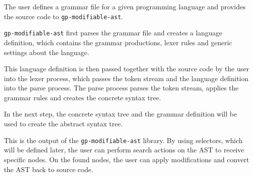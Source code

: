 The user defines a grammar file for a given programming language and provides the source code to \verb|gp-modifiable-ast|.

\verb|gp-modifiable-ast| first parses the grammar file and creates a language definition, which contains the grammar productions, lexer rules and generic settings
about the language.

This language definition is then passed together with the source code by the user into the lexer process, which passes the token stream and the language definition into
the parse process. The parse process parses the token stream, applies the grammar rules and creates the concrete syntax tree.

In the next step, the concrete syntax tree and the grammar definition will be used to create the abstract syntax tree.

This is the output of the \verb|gp-modifiable-ast| library. By using selectors, which will be defined later, the user can perform search actions on the AST to receive
specific nodes. On the found nodes, the user can apply modifications and convert the AST back to source code.


